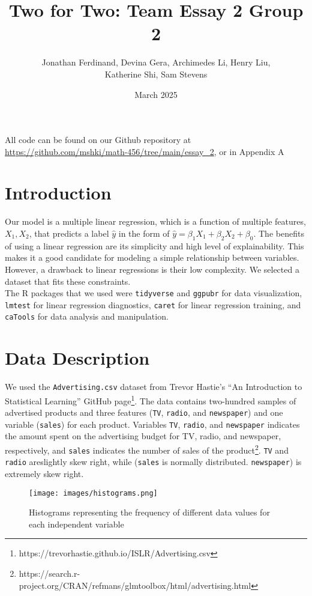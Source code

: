 \documentclass{article}
\title{Two for Two: Team Essay 2 Group 2}
\author{Jonathan Ferdinand, Devina Gera, Archimedes Li, Henry Liu, \\Katherine Shi, Sam Stevens}
\date{March 2025}
\begin{document}
\maketitle

All code can be found on our Github repository at \url{https://github.com/mshki/math-456/tree/main/essay_2}, or in Appendix A

\section{Introduction}

Our model is a multiple linear regression, which is a function of multiple features, $X_1, X_2$, that predicts a label $\hat{y}$ in the form of $\hat{y} = \beta_1X_1 +\beta_2X_2 + \beta_0$.  The benefits of using a linear regression are its simplicity and high level of explainability.  This makes it a good candidate for modeling a simple relationship between variables.  However, a drawback to linear regressions is their low complexity.  We selected a dataset that fits these constraints. \\

\noindent The R packages that we used were \texttt{tidyverse} and \texttt{ggpubr} for data visualization, \texttt{lmtest} for linear regression diagnostics, \texttt{caret} for linear regression training, and \texttt{caTools} for data analysis and manipulation.

\section{Data Description}
We used the \texttt{Advertising.csv} dataset from Trevor Hastie’s “An Introduction to Statistical Learning”  GitHub page\footnote{https://trevorhastie.github.io/ISLR/Advertising.csv}. The data contains two-hundred samples of advertised products and three features (\texttt{TV}, \texttt{radio}, and \texttt{newspaper}) and one variable (\texttt{sales}) for each product. Variables \texttt{TV}, \texttt{radio}, and \texttt{newspaper} indicates the amount spent on the advertising budget for TV, radio, and newspaper, respectively, and \texttt{sales} indicates the number of sales of the product\footnote{https://search.r-project.org/CRAN/refmans/glmtoolbox/html/advertising.html}. \texttt{TV} and \texttt{radio} areslightly skew right, while (\texttt{sales} is normally distributed.   \texttt{newspaper}) is extremely skew right.

\begin{figure}[h]
    \centering
    \texttt{[image: images/histograms.png]}
    \caption{Histograms representing the frequency of different data values for each independent variable}
    \label{fig:enter-label}
\end{figure}
\end{document}
